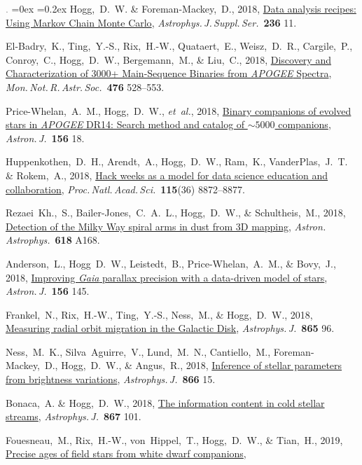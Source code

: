 \documentclass[12pt,letterpaper]{article}
\newcommand{\latin}[1]{\textsl{#1}}
\newcommand{\etal}{\latin{et~al.}}
\newcommand{\project}[1]{\textsl{#1}}
\newcommand{\doi}[2]{\href{http://dx.doi.org/#1}{{#2}}}
\newcommand{\deemph}[1]{\textcolor{grey}{\footnotesize{#1}}}
\newcommand{\pubnumber}[1]{\deemph{{#1}.}}
\newcounter{refpubnum}
\newcommand{\hogglist}{%
    \rightmargin=0in
    \leftmargin=0.18in
    \topsep=0ex
    \partopsep=0pt
    \itemsep=0.2ex
    \parsep=0pt
    \itemindent=-1.0\leftmargin
    \listparindent=0.0\leftmargin
    \settowidth{\labelsep}{~}
    \usecounter{refpubnum}
  }
\begin{document}
\begin{list}{\pubnumber{\therefpubnum}}{\hogglist}
Hogg,~D.~W. \& Foreman-Mackey,~D., 2018,
\doi{10.3847/1538-4365/aab76e}{Data analysis recipes: Using Markov Chain Monte Carlo},
\textit{Astrophys.\,J.\,Suppl.\,Ser.}\ \textbf{236} 11.
\item
El-Badry,~K., Ting,~Y.-S., Rix,~H.-W., Quataert,~E., Weisz,~D.~R., Cargile,~P., Conroy,~C., Hogg,~D.~W., Bergemann,~M., \& Liu,~C., 2018,
\doi{10.1093/mnras/sty240}{Discovery and Characterization of 3000+ Main-Sequence Binaries from \project{APOGEE} Spectra},
\textit{Mon.\,Not.\,R.\,Astr.\,Soc.}\ \textbf{476} 528--553.
\item
Price-Whelan,~A.~M., Hogg,~D.~W., \etal, 2018,
\doi{10.3847/1538-3881/aac387}{Binary companions of evolved stars in \project{APOGEE} DR14: Search method and catalog of $\sim5000$ companions},
\textit{Astron.\,J.}\ \textbf{156} 18.
\item
Huppenkothen,~D.~H., Arendt,~A., Hogg,~D.~W., Ram,~K., VanderPlas,~J.~T. \& Rokem,~A., 2018,
\doi{10.1073/pnas.1717196115}{Hack weeks as a model for data science education and collaboration},
\textit{Proc.\,Natl.\,Acad.\,Sci.}\ \textbf{115}(36) 8872--8877.
\item
Rezaei~Kh.,~S., Bailer-Jones,~C.~A.~L., Hogg,~D.~W., \& Schultheis,~M., 2018,
\doi{10.1051/0004-6361/201833284}{Detection of the Milky Way spiral arms in dust from 3D mapping},
\textit{Astron.\,Astrophys.}\ \textbf{618} A168.
\item
Anderson,~L., Hogg~D.~W., Leistedt,~B., Price-Whelan,~A.~M., \& Bovy,~J., 2018,
\doi{10.3847/1538-3881/aad7bf}{Improving \project{Gaia} parallax precision with a data-driven model of stars},
\textit{Astron.\,J.}\ \textbf{156} 145.
\item
Frankel,~N., Rix,~H.-W., Ting,~Y.-S., Ness,~M., \& Hogg,~D.~W., 2018,
\doi{10.3847/1538-4357/aadba5}{Measuring radial orbit migration in the Galactic Disk},
\textit{Astrophys.\,J.}\ \textbf{865} 96.
\item
Ness,~M.~K., Silva~Aguirre,~V., Lund,~M.~N., Cantiello,~M., Foreman-Mackey,~D.,
Hogg,~D.~W., \& Angus,~R., 2018,
\doi{10.3847/1538-4357/aadb40}{Inference of stellar parameters from brightness variations},
\textit{Astrophys.\,J.}\ \textbf{866} 15.
\item
Bonaca,~A. \& Hogg,~D.~W., 2018,
\doi{10.3847/1538-4357/aae4da}{The information content in cold stellar streams},
\textit{Astrophys.\,J.}\ \textbf{867} 101.
\item
Fouesneau,~M., Rix,~H.-W., von~Hippel,~T., Hogg,~D.~W., \& Tian,~H., 2019,
\doi{10.3847/1538-4357/aaee74}{Precise ages of field stars from white dwarf companions},

\end{list}
\end{document}

